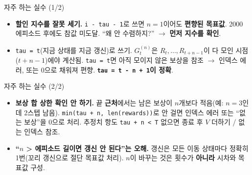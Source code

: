 \documentclass[aspectratio=169,11pt]{beamer}
\begin{document}

\begin{frame}{자주 하는 실수 (1/2)}
  \begin{itemize}
    \item \textbf{할인 지수를 잘못 세기.} \texttt{i - tau - 1}로 쓰면
      $n=1$이어도 \textbf{편향된 목표값}. 2000 에피소드 후에도 참값
      미도달. ``왜 안 수렴하지?'' $\to$ \textbf{먼저 지수를 확인}.
    \item \texttt{tau = t}(지금 상태를 지금 갱신)로 쓰기.
      $G_t^{(n)}$은 $R_t,\dots,R_{t+n-1}$이 다 모인 시점
      ($t+n-1$)에야 계산됨. \texttt{tau = t}면 아직 모이지 않은
      보상을 참조 $\to$ 인덱스 에러, 또는 0으로 채워져 편향.
      \textbf{\texttt{tau = t - n + 1}이 정확}.
  \end{itemize}
\end{frame}

\begin{frame}{자주 하는 실수 (2/2)}
  \begin{itemize}
    \item \textbf{보상 합 상한 확인 안 하기.} 끝 \textbf{근처}에서는
      남은 보상이 $n$개보다 적음(예: $n=3$인데 2스텝 남음).
      \texttt{min(tau + n, len(rewards))}로 안 걸면 인덱스 에러 또는
      ``없는 보상''을 0으로 처리. 추정치 항도 \texttt{tau + n < T}
      없으면 종료 후 $V$ 더하기 / 없는 인덱스 참조.
    \item \textbf{``$n$ > 에피소드 길이면 갱신 안 된다''는 오해.}
      갱신은 모든 이동 상태마다 정확히 1번(꼬리 갱신으로 절단
      목표값 처리). $n$이 바꾸는 것은 횟수가 \textbf{아니라} 시차와
      목표값 구성.
  \end{itemize}
\end{frame}
\end{document}
